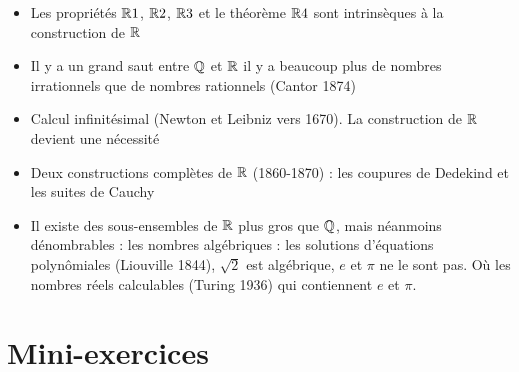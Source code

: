 \begin{frame}
\begin{itemize}[<+->]
  \item Les propriétés $\mathbb{R}1$, $\mathbb{R}2$, $\mathbb{R}3$ et le théorème $\mathbb{R}4$
sont intrinsèques à la construction de $\mathbb{R}$

  \item Il y a un grand saut entre $\mathbb{Q}$ et $\mathbb{R}$
 \og{}il y a beaucoup plus de nombres irrationnels que de nombres
 rationnels \fg{}
 (Cantor 1874)


  \item Calcul infinitésimal (Newton et Leibniz vers 1670). La construction de $\mathbb{R}$ devient
  une nécessité

  \item Deux constructions complètes de $\mathbb{R}$ (1860-1870) : les coupures de Dedekind et les suites de Cauchy

  \item Il existe des sous-ensembles de $\mathbb{R}$ plus gros que $\mathbb{Q}$, mais
  néanmoins dénombrables : les nombres algébriques : les solutions d'équations
  polynômiales (Liouville 1844), $\sqrt{2}$ est algébrique, $e$ et $\pi$ ne le sont pas. Où
  les nombres réels calculables (Turing 1936) qui contiennent $e$ et $\pi$.
\end{itemize}
\end{frame}



\section*{Mini-exercices}



